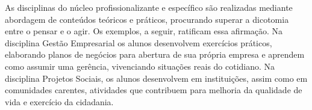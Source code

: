 \begin{quadro}[!h]	
\centering
{}		
\end{quadro}

As disciplinas do núcleo profissionalizante e específico são realizadas mediante abordagem de conteúdos teóricos e práticos, procurando superar a dicotomia entre o pensar e o agir. Os exemplos, a seguir, ratificam essa afirmação. Na disciplina Gestão Empresarial os alunos desenvolvem exercícios práticos, elaborando planos de negócios para abertura de sua própria empresa e aprendem como assumir uma gerência, vivenciando situações reais do cotidiano. Na disciplina Projetos Sociais, os alunos desenvolvem em instituições, assim como em comunidades carentes, atividades que contribuem para melhoria da qualidade de vida e exercício da cidadania.\\

